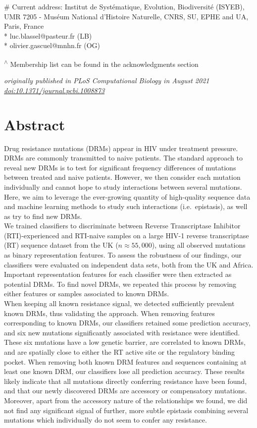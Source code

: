 \documentclass[
  11,
]{scrbook}
\begin{document}
\# Current address: Institut de Systématique, Evolution, Biodiversité
(ISYEB), UMR 7205 - Muséum National d'Histoire Naturelle, CNRS, SU, EPHE
and UA, Paris, France\\
* luc.blassel@pasteur.fr (LB)\\
* olivier.gascuel@mnhn.fr (OG)

\textsuperscript{\(\wedge\)} Membership list can be found in the acknowledgments section

\emph{originally published in PLoS Computational Biology in August 2021}\\
\emph{\href{https://doi.org/10.1371/journal.pcbi.1008873}{doi:10.1371/journal.pcbi.1008873}}

\hypertarget{abstract-paper}{%
\section*{Abstract}\label{abstract-paper}}

Drug resistance mutations (DRMs) appear in HIV under treatment pressure.
DRMs are commonly transmitted to naive patients. The standard approach
to reveal new DRMs is to test for significant frequency differences of
mutations between treated and naive patients. However, we then consider
each mutation individually and cannot hope to study interactions between
several mutations. Here, we aim to leverage the ever-growing quantity of
high-quality sequence data and machine learning methods to study such
interactions (i.e.~epistasis), as well as try to find new DRMs.\\
We trained classifiers to discriminate between Reverse Transcriptase
Inhibitor (RTI)-experienced and RTI-naive samples on a large HIV-1
reverse transcriptase (RT) sequence dataset from the UK
(\(n\approx 55,000\)), using all observed mutations as binary
representation features. To assess the robustness of our findings, our
classifiers were evaluated on independent data sets, both from the UK
and Africa. Important representation features for each classifier were
then extracted as potential DRMs. To find novel DRMs, we repeated this
process by removing either features or samples associated to known
DRMs.\\
When keeping all known resistance signal, we detected sufficiently
prevalent known DRMs, thus validating the approach. When removing
features corresponding to known DRMs, our classifiers retained some
prediction accuracy, and six new mutations significantly associated with
resistance were identified. These six mutations have a low genetic
barrier, are correlated to known DRMs, and are spatially close to either
the RT active site or the regulatory binding pocket. When removing both
known DRM features and sequences containing at least one known DRM, our
classifiers lose all prediction accuracy. These results likely indicate
that all mutations directly conferring resistance have been found, and
that our newly discovered DRMs are accessory or compensatory mutations.
Moreover, apart from the accessory nature of the relationships we found,
we did not find any significant signal of further, more subtle epistasis
combining several mutations which individually do not seem to confer any
resistance.
\end{document}

